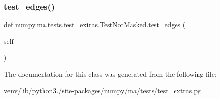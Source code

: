 \mbox{\label{classnumpy_1_1ma_1_1tests_1_1test__extras_1_1TestNotMasked_a59b03943069c21284e3b4671b4129a2d}} 
\subsubsection{\texorpdfstring{test\+\_\+edges()}{test\_edges()}}
{\footnotesize\ttfamily def numpy.\+ma.\+tests.\+test\+\_\+extras.\+Test\+Not\+Masked.\+test\+\_\+edges (\begin{DoxyParamCaption}\item[{}]{self }\end{DoxyParamCaption})}



The documentation for this class was generated from the following file\+:\begin{DoxyCompactItemize}
\item 
venv/lib/python3./site-\/packages/numpy/ma/tests/\hyperlink{test__extras_8py}{test\+\_\+extras.\+py}\end{DoxyCompactItemize}
